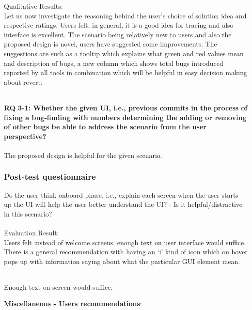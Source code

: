 Qualitative Results: \\

Let us now investigate the reasoning behind the user’s choice of solution idea and respective ratings. Users felt, in general, it is a good idea for tracing and also interface is excellent. The scenario being relatively new to users and also the proposed design is novel, users have suggested some improvements.  The suggestions are such as a tooltip which explains what green and red values mean and description of bugs, a new column which shows total bugs introduced reported by all tools in combination which will be helpful in easy decision making about revert. \\ \\

\begin{myboxi}{\textbf{RQ 3-1: Whether the given UI, i.e., previous commits in the process of fixing a bug-finding with numbers determining the adding or removing of other bugs be able to address the scenario from the user perspective?}}
\\ \\ The proposed design is helpful for the given scenario.
\end{myboxi}


\subsubsection{Post-test questionnaire}

Do the user think onboard phase, i.e., explain each screen when the user starts up the UI will help the user better understand the UI? - Is it helpful/distractive in this scenario? \\ \\

Evaluation Result: \\

Users felt instead of welcome screens, enough text on user interface would suffice. There is a general recommendation with having an ‘i’ kind of icon which on hover pops up with information saying about what the particular GUI element mean. \\ \\

\begin{myboxi}
	Enough text on screen would suffice.
\end{myboxi}
\hfill \break
\textbf{Miscellaneous - Users recommendations}: \\

